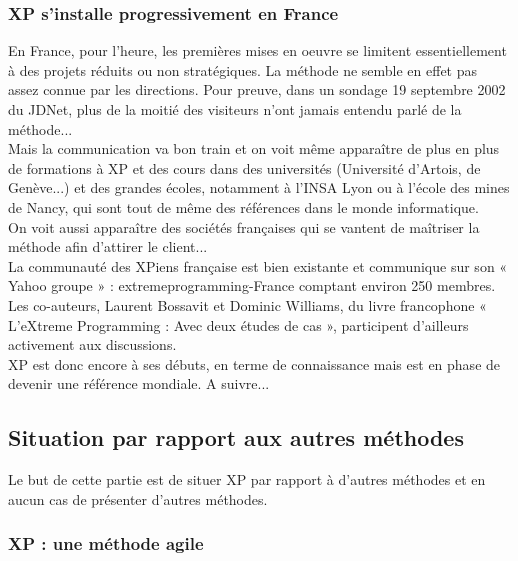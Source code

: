 \documentclass[]{article}
\begin{document}
\hypertarget{xp-sinstalle-progressivement-en-france}{%
\subsubsection{XP s'installe progressivement en
France}\label{xp-sinstalle-progressivement-en-france}}

En France, pour l'heure, les premières mises en oeuvre se limitent
essentiellement à des projets réduits ou non stratégiques. La méthode ne
semble en effet pas assez connue par les directions. Pour preuve, dans
un sondage 19 septembre 2002 du JDNet, plus de la moitié des visiteurs
n'ont jamais entendu parlé de la méthode...\\
Mais la communication va bon train et on voit même apparaître de plus en
plus de formations à XP et des cours dans des universités (Université
d'Artois, de Genève...) et des grandes écoles, notamment à l'INSA Lyon
ou à l'école des mines de Nancy, qui sont tout de même des références
dans le monde informatique.\\
On voit aussi apparaître des sociétés françaises qui se vantent de
maîtriser la méthode afin d'attirer le client...\\
La communauté des XPiens française est bien existante et communique sur
son « Yahoo groupe » : extremeprogramming-France comptant environ 250
membres. Les co-auteurs, Laurent Bossavit et Dominic Williams, du livre
francophone « L'eXtreme Programming : Avec deux études de cas »,
participent d'ailleurs activement aux discussions.\\
XP est donc encore à ses débuts, en terme de connaissance mais est en
phase de devenir une référence mondiale. A suivre...


\hypertarget{situation-par-rapport-aux-autres-muxe9thodes}{%
\subsection{\texorpdfstring{\textbf{Situation par rapport aux autres
méthodes}}{Situation par rapport aux autres méthodes}}\label{situation-par-rapport-aux-autres-muxe9thodes}}

Le but de cette partie est de situer XP par rapport à d'autres méthodes
et en aucun cas de présenter d'autres méthodes.



\hypertarget{xp-une-muxe9thode-agile}{%
\subsubsection{XP : une méthode agile}\label{xp-une-muxe9thode-agile}}
\end{document}
